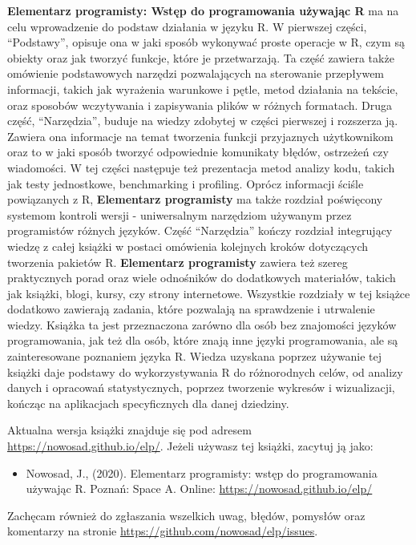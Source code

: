 \documentclass[paper=6in:9in,pagesize=pdftex,headinclude=on,footinclude=on,10pt]{scrbook}
\providecommand{\tightlist}{%
  \setlength{\itemsep}{0pt}\setlength{\parskip}{0pt}}
\begin{document}
\textbf{Elementarz programisty: Wstęp do programowania używając R} ma na celu wprowadzenie do podstaw działania w języku R.
W pierwszej części, ``Podstawy'', opisuje ona w jaki sposób wykonywać proste operacje w R, czym są obiekty oraz jak tworzyć funkcje, które je przetwarzają.
Ta część zawiera także omówienie podstawowych narzędzi pozwalających na sterowanie przepływem informacji, takich jak wyrażenia warunkowe i pętle, metod działania na tekście, oraz sposobów wczytywania i zapisywania plików w różnych formatach.
Druga część, ``Narzędzia'', buduje na wiedzy zdobytej w części pierwszej i rozszerza ją.
Zawiera ona informacje na temat tworzenia funkcji przyjaznych użytkownikom oraz to w jaki sposób tworzyć odpowiednie komunikaty błędów, ostrzeżeń czy wiadomości.
W tej części następuje też prezentacja metod analizy kodu, takich jak testy jednostkowe, benchmarking i profiling.
Oprócz informacji ściśle powiązanych z R, \textbf{Elementarz programisty} ma także rozdział poświęcony systemom kontroli wersji - uniwersalnym narzędziom używanym przez programistów różnych języków.
Część ``Narzędzia'' kończy rozdział integrujący wiedzę z całej książki w postaci omówienia kolejnych kroków dotyczących tworzenia pakietów R.
\textbf{Elementarz programisty} zawiera też szereg praktycznych porad oraz wiele odnośników do dodatkowych materiałów, takich jak książki, blogi, kursy, czy strony internetowe.
Wszystkie rozdziały w tej książce dodatkowo zawierają zadania, które pozwalają na sprawdzenie i utrwalenie wiedzy.
Książka ta jest przeznaczona zarówno dla osób bez znajomości języków programowania, jak też dla osób, które znają inne języki programowania, ale są zainteresowane poznaniem języka R.
Wiedza uzyskana poprzez używanie tej książki daje podstawy do wykorzystywania R do różnorodnych celów, od analizy danych i opracowań statystycznych, poprzez tworzenie wykresów i wizualizacji, kończąc na aplikacjach specyficznych dla danej dziedziny.

Aktualna wersja książki znajduje się pod adresem \url{https://nowosad.github.io/elp/}.
Jeżeli używasz tej książki, zacytuj ją jako:

\begin{itemize}
\tightlist
\item
  Nowosad, J., (2020). Elementarz programisty: wstęp do programowania używając R. Poznań: Space A. Online: \url{https://nowosad.github.io/elp/}
\end{itemize}

Zachęcam również do zgłaszania wszelkich uwag, błędów, pomysłów oraz komentarzy na stronie \url{https://github.com/nowosad/elp/issues}.
\end{document}
